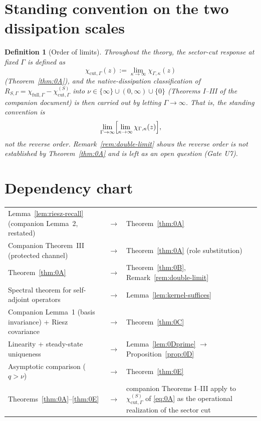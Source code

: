 \documentclass[11pt]{article}
\newtheorem{definition}[theorem]{Definition}
\begin{document}
\section{Standing convention on the two dissipation scales}
\label{sec:convention}

\begin{definition}[Order of limits]
\label{def:convention}
Throughout the theory, the sector-cut response at fixed $\Gamma$ is
\emph{defined} as
\[
\chi_{\mathrm{cut},\Gamma}(z):=\lim_{\kappa\to\infty}\chi_{\Gamma,\kappa}(z)
\]
(Theorem~\ref{thm:0A}), and the native-dissipation classification of
$R_{S,\Gamma}=\chi_{\mathrm{full},\Gamma}-\chi_{\mathrm{cut},\Gamma}^{(S)}$
into $\nu\in\{\infty\}\cup(0,\infty)\cup\{0\}$ (Theorems I--III of the
companion document) is then carried out by letting $\Gamma\to\infty$.
That is, the standing convention is
\[
\lim_{\Gamma\to\infty}\Bigl[\lim_{\kappa\to\infty}\chi_{\Gamma,\kappa}(z)\Bigr],
\]
\emph{not} the reverse order. Remark~\ref{rem:double-limit} shows the
reverse order is not established by Theorem~\ref{thm:0A} and is left as
an open question (Gate U7).
\end{definition}

\section*{Dependency chart}

\begin{center}
\begin{tabular}{lll}
Lemma~\ref{lem:riesz-recall} (companion Lemma~2, restated)
 & $\longrightarrow$ & Theorem~\ref{thm:0A}\\[2pt]
Companion Theorem~III (protected channel)
 & $\longrightarrow$ & Theorem~\ref{thm:0A} (role substitution)\\[2pt]
Theorem~\ref{thm:0A}
 & $\longrightarrow$ & Theorem~\ref{thm:0B}, Remark~\ref{rem:double-limit}\\[2pt]
Spectral theorem for self-adjoint operators
 & $\longrightarrow$ & Lemma~\ref{lem:kernel-suffices}\\[2pt]
Companion Lemma~1 (basis invariance) + Riesz covariance
 & $\longrightarrow$ & Theorem~\ref{thm:0C}\\[2pt]
Linearity + steady-state uniqueness
 & $\longrightarrow$ & Lemma~\ref{lem:0Dprime} $\longrightarrow$ Proposition~\ref{prop:0D}\\[2pt]
Asymptotic comparison ($q>\nu$)
 & $\longrightarrow$ & Theorem~\ref{thm:0E}\\[2pt]
Theorems~\ref{thm:0A}--\ref{thm:0E}
 & $\longrightarrow$ & companion Theorems I--III apply to
 $\chi_{\mathrm{cut},\Gamma}^{(S)}$ of \eqref{eq:0A} as the operational
 realization of the sector cut
\end{tabular}
\end{center}
\end{document}
